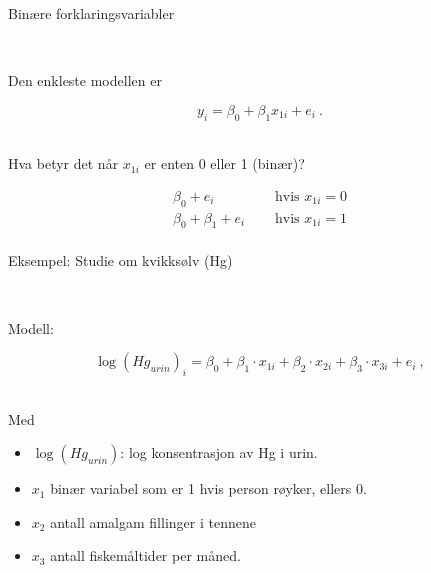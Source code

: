 \documentclass[10pt,ignorenonframetext,]{beamer}
\providecommand{\tightlist}{%
  \setlength{\itemsep}{0pt}\setlength{\parskip}{0pt}}
\begin{document}
\begin{frame}

\begin{block}{Binære forklaringsvariabler}

\(~\)

Den enkleste modellen er

\[y_i = \beta_0 + \beta_1 x_{1i} + e_i \ .\] \(~\)

Hva betyr det når \(x_{1i}\) er enten 0 eller 1 (binær)?

\[
\begin{array}{ll}
 \beta_0  + e_i \quad &\text{ hvis  } x_{1i}=0 \\
 \beta_0 + \beta_1 + e_i \quad &\text{ hvis  } x_{1i} =1\\
\end{array}
\]

\end{block}

\end{frame}

\begin{frame}

\begin{block}{Eksempel: Studie om kvikksølv (Hg)}

\(~\)

Modell:

\[
\log(Hg_{urin})_i  = \beta_0 +  \beta_1 \cdot x_{1i} +  \beta_2\cdot x_{2i} + \beta_3 \cdot x_{3i} + e_i \ ,
\] \(~\)

Med

\begin{itemize}
\tightlist
\item
  \(\log(Hg_{urin})\): log konsentrasjon av Hg i urin.
\item
  \(x_{1}\) binær variabel som er 1 hvis person røyker, ellers 0.
\item
  \(x_{2}\) antall amalgam fillinger i tennene
\item
  \(x_{3}\) antall fiskemåltider per måned.
\end{itemize}

\end{block}

\end{frame}
\end{document}

